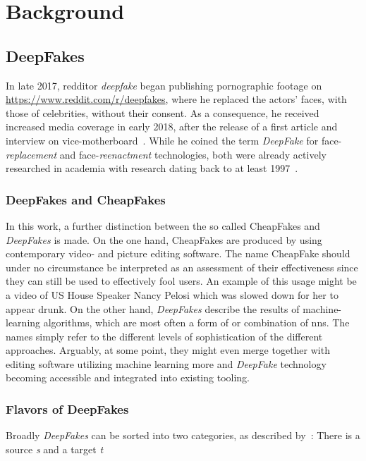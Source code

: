 \section{Background}\label{sect:background}
\subsection{DeepFakes}\label{subsect:deepfakes}
In late 2017, \gls{redditor} \textit{deepfake} began publishing pornographic footage
on \url{https://www.reddit.com/r/deepfakes}, where he replaced the actors' faces,
with those of celebrities, without their consent. As a consequence, he
received increased media coverage in early 2018, after the release of a first 
article and interview on vice-motherboard~\cite{Cole.2017}. While he coined the
term \textit{DeepFake} for face-\textit{replacement} and face-\textit{reenactment}
technologies, both were already actively researched in academia with research 
dating back to at least 1997~\cite{Bregler.1997}.

\subsubsection{DeepFakes and CheapFakes}
In this work, a further distinction between the so called CheapFakes and \textit{DeepFakes}
is made. On the one hand, CheapFakes are produced by using contemporary video- 
and picture editing software. The name CheapFake should under no circumstance be
interpreted as an assessment of their effectiveness since they can still be used
to effectively fool users. An example of this usage might be a video of US House
Speaker Nancy Pelosi which was slowed down for her to appear drunk.
On the other hand, \textit{DeepFakes} describe the results of machine-learning
algorithms, which are most often a form of or combination of \glspl{nn}.
The names simply refer to the different levels of sophistication of the different
approaches. Arguably, at some point, they might even merge together with editing 
software utilizing machine learning more and \textit{DeepFake} technology becoming
accessible and integrated into existing tooling.

\subsubsection{Flavors of DeepFakes}\label{subsubsect:deepfake-flavors}
Broadly \textit{DeepFakes} can be sorted into two categories, as described by~\textcite{mirsky_creation_2020}:
There is a source \textit{s} and a target \textit{t}

